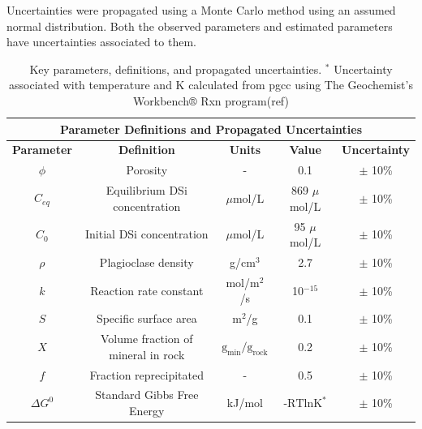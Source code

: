 Uncertainties were propagated using a Monte Carlo method using an assumed normal distribution. Both the observed parameters and estimated parameters have uncertainties associated to them.


\begin{table}[H]
    \centering
    \renewcommand{\arraystretch}{1.3} %
    {\small
    \begin{tabular}{|c|c|c|c|c|}
        \hline
        \multicolumn{5}{|c|}{\textbf{Parameter Definitions and Propagated Uncertainties}} \\  
        \hline
        \textbf{Parameter} & \textbf{Definition} & \textbf{Units} & \textbf{Value} & \textbf{Uncertainty} \\  
        \hline
        $\phi$ & Porosity & - & 0.1 & $\pm$ 10\% \\  
        $C_{eq}$ & Equilibrium DSi concentration & $\mu$mol/L & 869 $\mu$mol/L & $\pm$ 10\% \\  
        $C_0$ & Initial DSi concentration & $\mu$mol/L & 95 $\mu$mol/L & $\pm$ 10\% \\  
        $\rho$ & Plagioclase density & g/cm$^3$ & 2.7 & $\pm$ 10\% \\  
        $k$ & Reaction rate constant & mol/m$^2$/s & 10$^{-15}$ & $\pm$ 10\% \\  
        $S$ & Specific surface area & m$^2$/g & 0.1 & $\pm$ 10\% \\  
        $X$ & Volume fraction of mineral in rock & $\text{g}_{\text{min}}/\text{g}_{\text{rock}}$ & 0.2 & $\pm$ 10\% \\   
        $f$ & Fraction reprecipitated & - & 0.5 & $\pm$ 10\% \\
        $\Delta G^0$ & Standard Gibbs Free Energy & kJ/mol & $\text{-RTlnK}^*$ & $\pm$ 10\% \\
        \hline
    \end{tabular}}
    \caption{Key parameters, definitions, and propagated uncertainties. $^*$ Uncertainty associated with temperature and K calculated from pgcc using The Geochemist's Workbench® Rxn program(ref)}
    \label{tab:parameters_with_uncertainty}
\end{table}

\FloatBarrier




